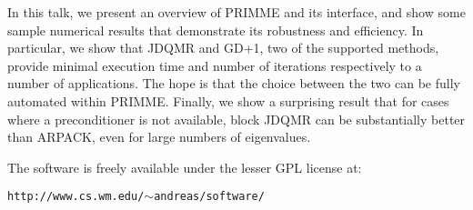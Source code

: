 \documentclass{report}
\begin{document}
In this talk, we present an overview of PRIMME and its interface,
and show some sample numerical results that demonstrate its robustness
and efficiency. In particular, we show that JDQMR and GD+1, two of the
supported methods, provide minimal execution time and number of iterations
respectively to a number of applications. The hope is that the choice
between the two can be fully automated within PRIMME.
Finally, we show a surprising result that for cases where a preconditioner
is not available, block JDQMR can be substantially better than ARPACK,
even for large numbers of eigenvalues.

The software is freely available under the lesser GPL license at:
\begin{center}
\tt{http://www.cs.wm.edu/$\sim$andreas/software/}
\end{center}
\end{document}
